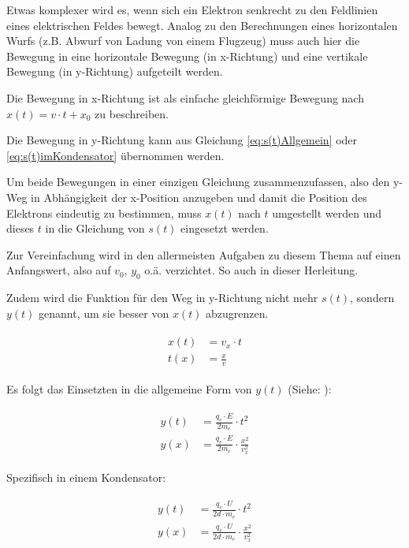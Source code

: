 Etwas komplexer wird es, wenn sich ein Elektron senkrecht zu den Feldlinien eines elektrischen Feldes bewegt. Analog zu den Berechnungen eines horizontalen Wurfs (z.B. Abwurf von Ladung von einem Flugzeug) muss auch hier die Bewegung in eine horizontale Bewegung (\glqq in x-Richtung\grqq) und eine vertikale Bewegung (\glqq in y-Richtung\grqq) aufgeteilt werden. 

Die Bewegung in x-Richtung ist als einfache gleichförmige Bewegung nach $x(t)=v \cdot t + x_0$ zu beschreiben. 

Die Bewegung in y-Richtung kann aus Gleichung \ref{eq:s(t)Allgemein} oder \ref{eq:s(t)imKondensator} übernommen werden.

Um beide Bewegungen in einer einzigen Gleichung zusammenzufassen, also den y-Weg in Abhängigkeit der x-Position anzugeben und damit die Position des Elektrons eindeutig zu bestimmen, muss $x(t)$ nach $t$ umgestellt werden und dieses $t$ in die Gleichung von $s(t)$ eingesetzt werden. 

\begin{NiceToKnow}
Zur Vereinfachung wird in den allermeisten Aufgaben zu diesem Thema auf einen Anfangswert, also auf $v_0$, $y_0$ o.ä. verzichtet. So auch in dieser Herleitung.
\end{NiceToKnow}

Zudem wird die Funktion für den Weg in y-Richtung nicht mehr $s(t)$, sondern $y(t)$ genannt, um sie besser von $x(t)$ abzugrenzen.

\begin{align} \label{eq:x(t)Senkrecht}
\begin{split}
	x(t) &= v_x \cdot t \\
	t(x) &= \frac{x}{v}
\end{split}
\end{align}

\noindent Es folgt das Einsetzten in die allgemeine Form von $y(t)$ (Siehe: ):

\begin{align} \label{eq:y(x)Allgemein}
\begin{split}
	y(t) &= \frac{q_e \cdot E}{2m_e} \cdot t^2 \\
	y(x) &= \frac{q_e \cdot E}{2m_e} \cdot \frac{x^2}{v_{x}^2}
\end{split}
\end{align}

\noindent Spezifisch in einem Kondensator:

\begin{align} \label{eq:y(x)imKondensator}
\begin{split}
	y(t) &= \frac{q_e \cdot U}{2d \cdot m_e} \cdot t^2 \\
	y(x) &= \frac{q_e \cdot U}{2d \cdot m_e} \cdot \frac{x^2}{v_{x}^2}
\end{split}
\end{align}






